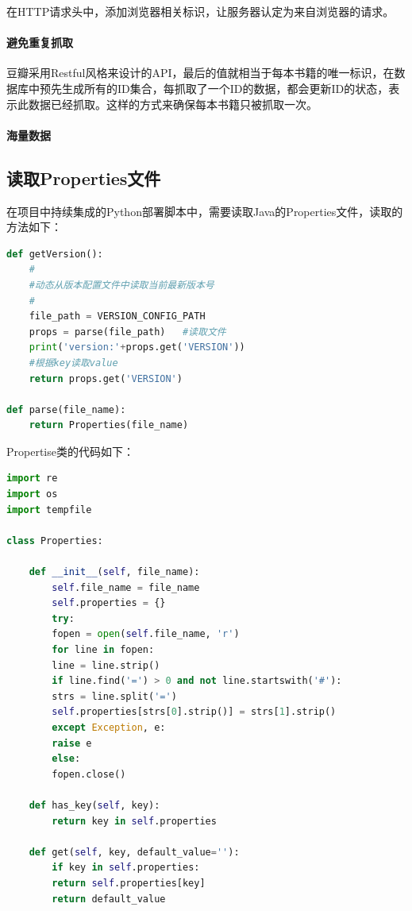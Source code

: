 \documentclass[letter]{book}
\begin{document}
在HTTP请求头中，添加浏览器相关标识，让服务器认定为来自浏览器的请求。

\paragraph{避免重复抓取}豆瓣采用Restful风格来设计的API，最后的值就相当于每本书籍的唯一标识，在数据库中预先生成所有的ID集合，每抓取了一个ID的数据，都会更新ID的状态，表示此数据已经抓取。这样的方式来确保每本书籍只被抓取一次。

\paragraph{海量数据}

\subsection{读取Properties文件}

在项目中持续集成的Python部署脚本中，需要读取Java的Properties文件，读取的方法如下：

\begin{lstlisting}[language=Python]
def getVersion():
	#
	#动态从版本配置文件中读取当前最新版本号
	#
	file_path = VERSION_CONFIG_PATH
	props = parse(file_path)   #读取文件
	print('version:'+props.get('VERSION'))
	#根据key读取value
	return props.get('VERSION')            

def parse(file_name):
	return Properties(file_name)
\end{lstlisting}

Propertise类的代码如下：

\begin{lstlisting}[language=Python]
import re
import os
import tempfile

class Properties:

	def __init__(self, file_name):
		self.file_name = file_name
		self.properties = {}
		try:
		fopen = open(self.file_name, 'r')
		for line in fopen:
		line = line.strip()
		if line.find('=') > 0 and not line.startswith('#'):
		strs = line.split('=')
		self.properties[strs[0].strip()] = strs[1].strip()
		except Exception, e:
		raise e
		else:
		fopen.close()
	
	def has_key(self, key):
		return key in self.properties
	
	def get(self, key, default_value=''):
		if key in self.properties:
		return self.properties[key]
		return default_value
\end{lstlisting}
\end{document}
